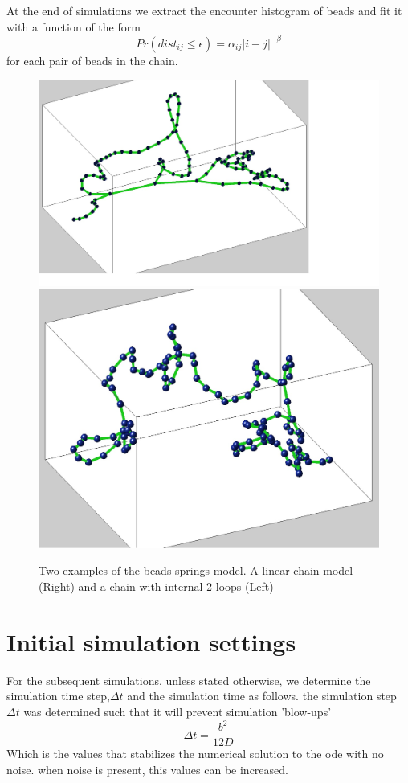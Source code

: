 \documentclass[12pt]{book}
\begin{document}
At the end of simulations we extract the encounter histogram of beads and fit it with a function of the form 
\begin{equation*}
Pr(dist_{ij}\leq \epsilon)=\alpha_{ij}|i-j|^{-\beta}
\end{equation*}
for each pair of beads in the chain. 
\begin{figure}[H]
\includegraphics[scale=0.2]{chainExample108BeadsWith2Loops}
\includegraphics[scale=0.2]{chainExample108Beads}
\caption{\scriptsize{Two examples of the beads-springs model. A linear chain model (Right) and a chain with internal 2 loops (Left)}}
\label{figure_exampleOfChains}
\end{figure}


\section{Initial simulation settings}\label{section_initialSimulationSettings}
For the subsequent simulations, unless stated otherwise, we determine the simulation time step,$\Delta t$ and the simulation time as follows. 
the simulation step $\Delta t$  was determined such that it will prevent simulation 'blow-ups'
\begin{equation*}
 \Delta t = \frac{b^2}{12D}
\end{equation*}
Which is the values that stabilizes the numerical solution to the ode with no noise. when noise is present, this values can be increased.
\end{document}
